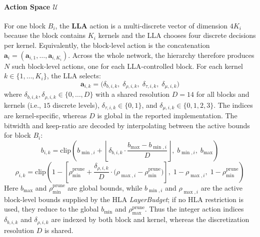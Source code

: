 \documentclass[preprint,12pt,authoryear]{elsarticle}
\begin{document}
\paragraph{Action Space $\mathcal{U}$}
For one block $B_i$, the \textbf{LLA} action is a multi-discrete vector of dimension
$4K_i$ because the block contains $K_i$ kernels and the LLA chooses four discrete decisions
per kernel. Equivalently, the block-level action is the concatenation
$\mathbf{a}_i=(\mathbf{a}_{i,1},\ldots,\mathbf{a}_{i,K_i})$. Across the whole network,
the hierarchy therefore produces $N$ such block-level actions, one for each LLA-controlled
block. For each kernel $k \in \{1,\ldots,K_i\}$, the LLA selects:
\begin{equation}
    \mathbf{a}_{i,k} = \bigl(\delta_{b,i,k},\; \delta_{\rho,i,k},\;
    \delta_{\tau,i,k},\; \delta_{\mu,i,k}\bigr)
    \label{eq:lla_action}
\end{equation}
\noindent where $\delta_{b,i,k}, \delta_{\rho,i,k} \in \{0,\ldots,D\}$ with a shared
resolution $D=14$ for all blocks and kernels (i.e., $15$ discrete levels),
$\delta_{\tau,i,k} \in \{0,1\}$, and $\delta_{\mu,i,k} \in \{0,1,2,3\}$. The indices
are kernel-specific, whereas $D$ is global in the reported implementation. The bitwidth
and keep-ratio are decoded by interpolating between the active bounds for block $B_i$:
\begin{equation}
    b_{i,k} = \mathrm{clip}\!\left(
        b_{\min,i} + \left\lfloor \delta_{b,i,k} \cdot
        \frac{b_{\max} - b_{\min,i}}{D} \right\rfloor,\;
        b_{\min,i},\; b_{\max}
    \right)
    \label{eq:bits_decode}
\end{equation}
\begin{equation}
    \rho_{i,k} = \mathrm{clip}\!\left(
        1 - \left[
            \rho_{\min}^{\mathrm{prune}} + \frac{\delta_{\rho,i,k}}{D}
            \cdot \bigl(\rho_{\max,i} - \rho_{\min}^{\mathrm{prune}}\bigr)
        \right],\;
        1 - \rho_{\max,i},\;
        1 - \rho_{\min}^{\mathrm{prune}}
    \right)
    \label{eq:prune_decode}
\end{equation}
Here $b_{\max}$ and $\rho_{\min}^{\mathrm{prune}}$ are global bounds, while
$b_{\min,i}$ and $\rho_{\max,i}$ are the active block-level bounds supplied by the HLA
\textit{LayerBudget}; if no HLA restriction is used, they reduce to the global
$b_{\min}$ and $\rho_{\max}^{\mathrm{prune}}$. Thus the integer action indices
$\delta_{b,i,k}$ and $\delta_{\rho,i,k}$ are indexed by both block and kernel, whereas
the discretization resolution $D$ is shared.
\end{document}
